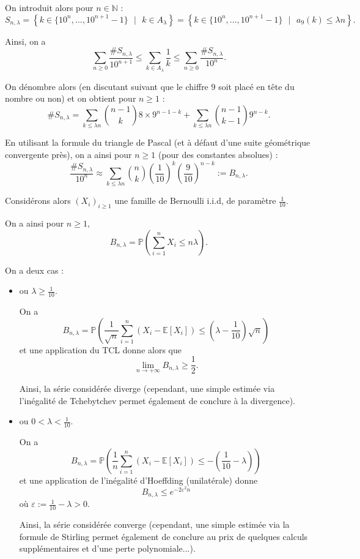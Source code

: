 On introduit alors pour $n\in \mathbb{N}$ : $$ S_{n,\lambda}=\left\{ k\in\{10^{n},\ldots,10^{n+1}-1\}\mbox{ }|\mbox{ } k\in A_{\lambda} \right\}=\left\{ k\in\{10^{n},\ldots,10^{n+1}-1\}\mbox{ }|\mbox{ } a_{9}(k)\leq \lambda n\right\}.$$

Ainsi, on a $$ \sum_{n\geq 0}\frac{\# S_{n,\lambda}}{10^{n+1}}\leq \sum_{k\in A_{\lambda}}\frac{1}{k}\leq \sum_{n\geq 0}\frac{\# S_{n,\lambda}}{10^{n}}.$$

On dénombre alors (en discutant suivant que le chiffre $9$ soit placé en tête du nombre ou non) et on obtient pour $n\geq 1$  : $$\# S_{n,\lambda}=\sum_{k\leq \lambda n}\binom{n-1}{k}8\times 9^{n-1-k} + \sum_{k\leq \lambda n}\binom{n-1}{k-1}9^{n-k}.$$

En utilisant la formule du triangle de Pascal (et à défaut d'une suite géométrique convergente près), on a ainsi pour $n\geq 1$ (pour des constantes absolues) : $$ \frac{\# S_{n,\lambda}}{10^{n}}\approx \sum_{k\leq \lambda n}\binom{n}{k}(\frac{1}{10})^{k}(\frac{9}{10})^{n-k}:=B_{n,\lambda}.$$

Considérons alors $(X_{i})_{i\geq 1}$ une famille de Bernoulli i.i.d, de paramètre $\frac{1}{10}.$

On a ainsi pour $n\geq 1,$ $$ B_{n,\lambda}=\mathbb{P}(\sum_{i=1}^{n}X_{i} \leq n\lambda).$$

On a deux cas : 
\begin{itemize}
    \item ou $\displaystyle \lambda\geq \frac{1}{10}.$
    
On a $$ B_{n,\lambda}=\mathbb{P}\left( \frac{1}{\sqrt{n}}\sum_{i=1}^{n}\left( X_{i}-\mathbb{E}[X_{i}]\right)\leq (\lambda-\frac{1}{10})\sqrt{n}\right)$$ et une application du TCL donne alors que $$ \lim_{n\rightarrow +\infty} B_{n,\lambda}\geq \frac{1}{2}.$$

Ainsi, la série considérée diverge (cependant, une simple estimée via l'inégalité de Tchebytchev permet également de conclure à la divergence).

\item ou $\displaystyle 0<\lambda<\frac{1}{10}.$

On a $$ B_{n,\lambda}=\mathbb{P}\left( \frac{1}{n}\sum_{i=1}^{n}\left( X_{i}-\mathbb{E}[X_{i}]\right)\leq -(\frac{1}{10}-\lambda)\right)$$ et une application de l'inégalité d'Hoeffding (unilatérale) donne $$B_{n,\lambda}\leq e^{-2\varepsilon^{2}n}$$ où $\displaystyle \varepsilon:=\frac{1}{10}-\lambda>0.$

Ainsi, la série considérée converge (cependant, une simple estimée via la formule de Stirling permet également de conclure au prix de quelques calculs supplémentaires et d'une perte polynomiale...).    
    
\end{itemize}

